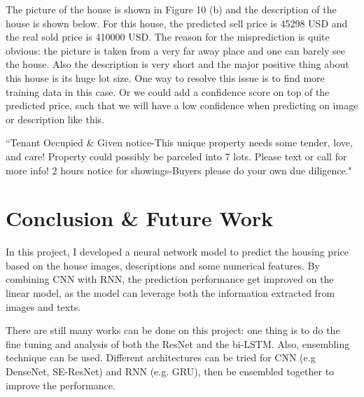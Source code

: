 \documentclass{article} %
\begin{document}
The picture of the house is shown in Figure 10 (b) and 
the description of the house is shown below.
For this house, the predicted sell price is 45298 USD and the real sold price is 410000 USD.
The reason for the misprediction is quite obvious:
the picture is taken from a very far away place and one can barely see the house.
Also the description is very short and the major positive thing about this house is its huge lot size.
One way to resolve this issue is to find more training data in this case.
Or we could add a confidence score on top of the predicted price,
such that we will have a low confidence when predicting on image or description like this.

``Tenant Occupied \& Given notice-This unique property needs some tender, love, and care! Property could possibly be parceled into 7 lots. Please text or call for more info! 2 hours notice for showings-Buyers please do your own due diligence."

\section{Conclusion \& Future Work}

In this project, I developed a neural network model to predict the housing price
based on the house images, descriptions and some numerical features.
By combining CNN with RNN, the prediction performance get improved on the linear model,
as the model can leverage both the information extracted from images and texts.

There are still many works can be done on this project:
one thing is to do the fine tuning and analysis of both the ResNet and the bi-LSTM. 
Also, ensembling technique can be used. Different architectures can be tried for CNN (e.g DenseNet, SE-ResNet) and RNN (e.g. GRU), then be ensembled together to improve the performance.


{\small
	
	
}
\end{document}
